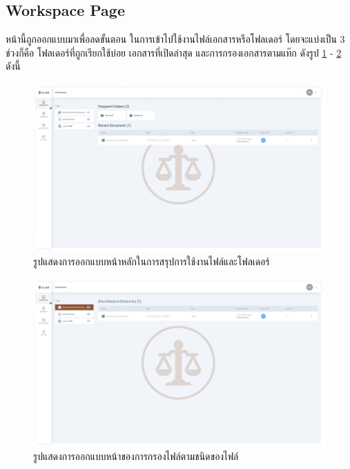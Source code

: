 \documentclass[12pt,oneside,openright,a4paper]{cpe-thai-project}
\begin{document}
\newpage
\subsection{Workspace Page}
\hspace*{1cm} หน้านี้ถูกออกแบบมาเพื่อลดขั้นตอน ในการเข้าไปใช้งานไฟล์เอกสารหรือโฟลเดอร์ โดยจะแบ่งเป็น 3 ช่วงก็คือ โฟลเดอร์ที่ถูกเรียกใช้บ่อย เอกสารที่เปิดล่าสุด และการกรองเอกสารตามแท๊ก ดังรูป  \ref{fig:workspace-page} - \ref{fig:workspace-tags-filter} ดังนี้
\begin{figure}[!h]\centering
  \includegraphics[width=16cm]{./assets/userinterface/workshop-page.png}
  \caption{รูปแสดงการออกแบบหน้าหลักในการสรุปการใช้งานไฟล์และโฟลเดอร์}\label{fig:workspace-page}
\end{figure}

\begin{figure}[!h]\centering
  \includegraphics[width=16cm]{./assets/userinterface/workshop-tags-filter.png}
  \caption{รูปแสดงการออกแบบหน้าของการกรองไฟล์ตามชนิดของไฟล์}\label{fig:workspace-tags-filter}
\end{figure}
\end{document}
